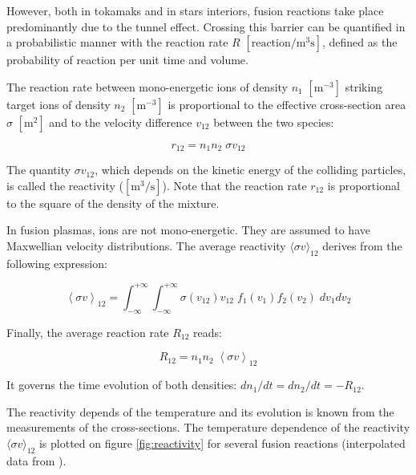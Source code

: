 However, both in tokamaks and in stars interiors, fusion reactions take place predominantly due to the tunnel effect. Crossing this barrier can be quantified in a probabilistic manner with the reaction rate $R$ $[\mathrm{reaction/m^3 s}]$, defined as the probability of reaction per unit time and volume. 

The reaction rate between mono-energetic ions of density $n_1$ $\mathrm{[m^{-3}]}$ striking target ions of density $n_2$ $\mathrm{[m^{-3}]}$ is proportional to the effective cross-section area $\sigma$ $\mathrm{[m^2]}$ and to the velocity difference $v_{12}$ between the two species:

\begin{equation*}
r_{12} = n_1 n_2 \; \sigma v_{12}
\end{equation*}

The quantity $\sigma v_{12}$, which depends on the kinetic energy of the colliding particles, is called the reactivity ($\mathrm{[m^3/s]}$). Note that the reaction rate $r_{12}$ is proportional to the square of the density of the mixture. 

In fusion plasmas, ions are not mono-energetic. They are assumed to have Maxwellian velocity distributions. The average reactivity $\langle \sigma v \rangle_{12}$ derives from the following expression:

\begin{equation*}
\left < \sigma v \right >_{12} 
= \int_{-\infty}^{+\infty} \int_{-\infty}^{+\infty} 
\sigma(v_{12}) v_{12}\;  f_1(v_1) f_2(v_2) \; dv_1dv_2
\end{equation*}

Finally, the average reaction rate $R_{12}$ reads:

\begin{equation*}
R_{12} = n_1 n_2 \; \left < \sigma v \right >_{12}
\end{equation*}

It governs the time evolution of both densities: $dn_1/dt = dn_2/dt = -R_{12}$.


The reactivity depends of the temperature and its evolution is known from the measurements of the cross-sections. The temperature dependence of the reactivity $\langle \sigma v \rangle_{12}$ is plotted on figure \ref{fig:reactivity} for several fusion reactions (interpolated data from \cite{Huba2013}). 


